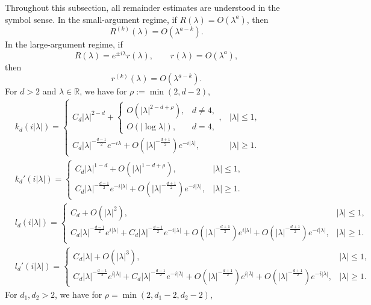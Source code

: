 \documentclass[12pt]{amsart}
\begin{document}
 
Throughout this subsection, all remainder estimates are understood in the symbol sense. In the small-argument regime, if $R(\lambda)=O(\lambda^a)$, then
\begin{equation*}
R^{(k)}(\lambda)=O(\lambda^{a-k}).
\end{equation*}
In the large-argument regime, if
\begin{equation*}
R(\lambda)=e^{\pm i\lambda}r(\lambda),
\qquad r(\lambda)=O(\lambda^a),
\end{equation*}
then
\begin{equation*}
r^{(k)}(\lambda)=O(\lambda^{a-k}).
\end{equation*}
For $d>2$ and $\lambda \in \mathbb R$, we have for $\rho := \min (2, d-2)$, 
\begin{align*}
    &k_d(i|\lambda|) = \begin{cases}
        C_d |\lambda|^{2-d} + \begin{cases}
            O\left( |\lambda|^{2-d+\rho} \right), & d\ne 4,\\
            O\left( |\log{\lambda}| \right), & d=4,
        \end{cases}, & |\lambda|\le 1, \\
        C_d |\lambda|^{-\frac{d-1}{2}} e^{-i\lambda} +  O\left( |\lambda|^{-\frac{d+1}{2}} \right) e^{-i|\lambda|}, & |\lambda|\ge 1.
    \end{cases}\\
    &k_d'(i|\lambda|) = \begin{cases}
        C_d |\lambda|^{1-d} + O\left(|\lambda|^{1-d+\rho} \right), & |\lambda|\le 1, \\
        C_d |\lambda|^{-\frac{d-1}{2}} e^{-i|\lambda|} +  O\left( |\lambda|^{-\frac{d+1}{2}} \right) e^{-i|\lambda|}, & |\lambda|\ge 1.
    \end{cases}\\
    &l_d(i|\lambda|) = \begin{cases}
        C_d + O\left(|\lambda|^2 \right), & |\lambda|\le 1, \\
        C_d |\lambda|^{-\frac{d-1}{2}} e^{i|\lambda|} + C_d|\lambda|^{-\frac{d-1}{2}} e^{-i|\lambda|} + O\left(|\lambda|^{-\frac{d+1}{2}}\right) e^{i|\lambda|} + O\left(|\lambda|^{-\frac{d+1}{2}}\right) e^{-i|\lambda|}, & |\lambda|\ge 1.
    \end{cases}\\
    &l_d'(i|\lambda|) = \begin{cases}
        C_d |\lambda| + O\left(|\lambda|^3 \right), & |\lambda|\le 1, \\
        C_d|\lambda|^{-\frac{d-1}{2}} e^{i|\lambda|} + C_d|\lambda|^{-\frac{d-1}{2}} e^{-i|\lambda|} + O\left(|\lambda|^{-\frac{d+1}{2}}\right) e^{i|\lambda|} + O\left(|\lambda|^{-\frac{d+1}{2}}\right) e^{-i|\lambda|}, & |\lambda|\ge 1.
    \end{cases}
\end{align*}
For $d_1, d_2>2$, we have for $\rho = \min (2, d_1-2, d_2-2)$,
\end{document}
